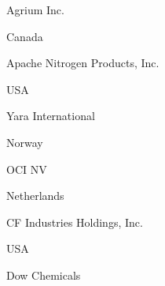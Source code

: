 \documentclass[a4paper,portrait,12pt]{article}
\begin{document}
\begin{flushleft}
Agrium Inc.
\end{flushleft}





\begin{flushleft}
Canada
\end{flushleft}





\begin{flushleft}
Apache Nitrogen Products, Inc.
\end{flushleft}





\begin{flushleft}
USA
\end{flushleft}





\begin{flushleft}
Yara International
\end{flushleft}





\begin{flushleft}
Norway
\end{flushleft}





\begin{flushleft}
OCI NV
\end{flushleft}





\begin{flushleft}
Netherlands
\end{flushleft}





\begin{flushleft}
CF Industries Holdings, Inc.
\end{flushleft}





\begin{flushleft}
USA
\end{flushleft}





\begin{flushleft}
Dow Chemicals
\end{flushleft}
\end{document}
